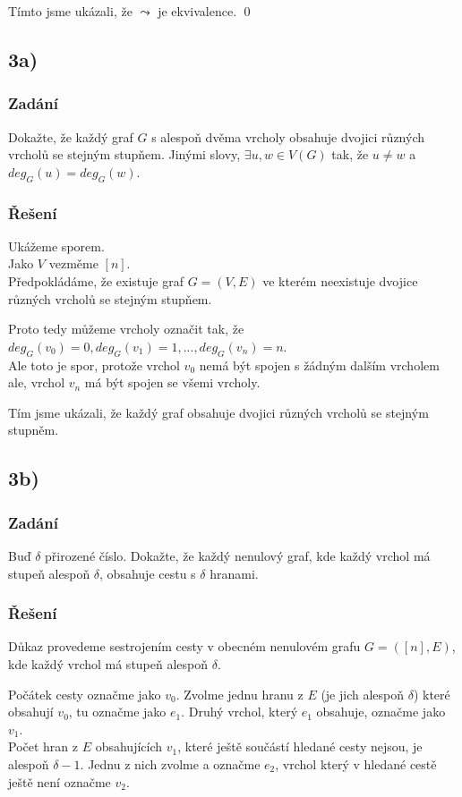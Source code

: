 \documentclass[../main.tex]{subfiles}
\begin{document}
Tímto jsme ukázali, že $\leadsto$ je ekvivalence.  
\qed


\subsection{3a)}
\subsubsection*{Zadání}
Dokažte, že každý graf $G$ s alespoň dvěma vrcholy obsahuje dvojici různých vrcholů se stejným stupňem. Jinými slovy, $\exists u,w \in V(G)$
tak, že $u\neq w$ a $deg_G(u) = deg_G(w)$.
\subsubsection*{Řešení}

Ukážeme sporem. \\
Jako $V$ vezměme $[n]$.\\
Předpokládáme, že existuje graf $G = (V,E)$ ve kterém neexistuje dvojice různých vrcholů se stejným stupňem.

Proto tedy můžeme vrcholy označit tak, že $deg_G(v_0) = 0, deg_G(v_1) = 1, ..., deg_G(v_n)=n$.\\
Ale toto je spor, protože vrchol $v_0$ nemá být spojen s žádným dalším vrcholem ale, vrchol $v_n$ má být spojen se všemi vrcholy.

Tím jsme ukázali, že každý graf obsahuje dvojici různých vrcholů se stejným stupněm. 


\subsection{3b)}
\subsubsection*{Zadání}
Buď $\delta$ přirozené číslo. Dokažte, že každý nenulový graf, kde každý vrchol má stupeň alespoň $\delta$, obsahuje cestu s $\delta$ hranami.
\subsubsection*{Řešení}

Důkaz provedeme sestrojením cesty v obecném nenulovém grafu $G=([n], E)$, kde každý vrchol má stupeň alespoň $\delta$.


Počátek cesty označme jako $v_0$. 
Zvolme jednu hranu z $E$ (je jich alespoň $\delta$) které obsahují $v_0$, tu označme jako $e_1$.
Druhý vrchol, který $e_1$ obsahuje, označme jako $v_1$.\\
Počet hran z $E$ obsahujících $v_1$, které ještě součástí hledané cesty nejsou, je alespoň $\delta-1$.
Jednu z nich zvolme a označme $e_2$, vrchol který v hledané cestě ještě není označme $v_2$.
\end{document}
